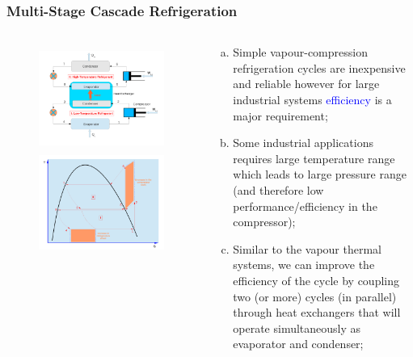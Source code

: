 \documentclass[10pt,compress,handout,ignorenonframetext]{beamer}
\begin{document}
\begin{frame}
 \frametitle{Multi-Stage Cascade Refrigeration}
 \begin{columns}
  \begin{column}[c]{0.45\linewidth}
   \begin{figure}%
     \vbox{
      \includegraphics[width=4.5cm,height=3.5cm,clip]{./Pics/Overview_Refrig24}
      \vspace{-.1cm}
      \includegraphics[width=4.cm,height=4.cm,clip]{./Pics/Overview_Refrig25}}
   \end{figure}  
  \end{column}  
  \begin{column}[c]{0.55\linewidth}
   \begin{enumerate}[(a)]
    \item <1-> Simple vapour-compression refrigeration cycles are inexpensive and reliable however for large industrial systems \textcolor{blue}{efficiency} is a major requirement;
    \item <2-> Some industrial applications requires large temperature range which leads to large pressure range (and therefore low performance/efficiency in the compressor);
    \item <3-> Similar to the vapour thermal systems, we can improve the efficiency of the cycle by coupling two (or more) cycles (in parallel) through heat exchangers that will operate simultaneously as evaporator and condenser;
   \end{enumerate} 
  \end{column}  
 \end{columns} 
\end{frame}
\end{document}
